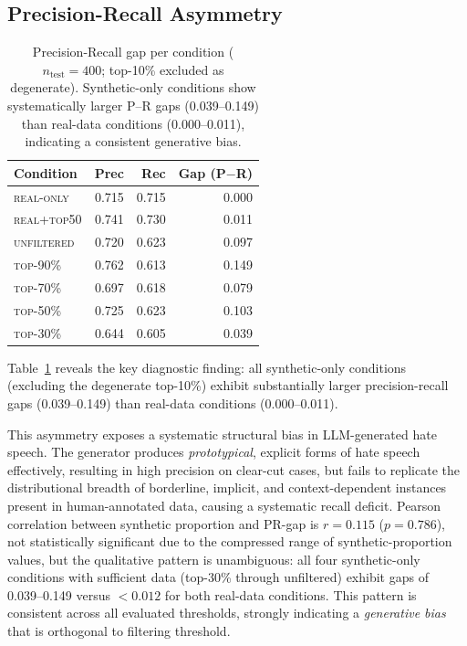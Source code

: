 \documentclass[11pt]{article}
\begin{document}
\subsection{Precision-Recall Asymmetry}

\begin{table}[t]
\centering
\small
\setlength{\tabcolsep}{5pt}
\begin{tabular}{lrrr}
\toprule
\textbf{Condition} & \textbf{Prec} & \textbf{Rec} & \textbf{Gap (P$-$R)} \\
\midrule
\textsc{real-only}   & 0.715 & 0.715 & \phantom{$-$}0.000 \\
\textsc{real+top50} & 0.741 & 0.730 & \phantom{$-$}0.011 \\
\midrule
\textsc{unfiltered}  & 0.720 & 0.623 & \phantom{$-$}0.097 \\
\textsc{top-90\%}    & 0.762 & 0.613 & \phantom{$-$}0.149 \\
\textsc{top-70\%}    & 0.697 & 0.618 & \phantom{$-$}0.079 \\
\textsc{top-50\%}    & 0.725 & 0.623 & \phantom{$-$}0.103 \\
\textsc{top-30\%}    & 0.644 & 0.605 & \phantom{$-$}0.039 \\
\bottomrule
\end{tabular}
\caption{Precision-Recall gap per condition ($n_{\text{test}}=400$; top-10\% excluded as degenerate).
  Synthetic-only conditions show systematically larger P--R gaps (0.039--0.149)
  than real-data conditions (0.000--0.011), indicating a consistent generative bias.}
\label{tab:pr_gap}
\end{table}

Table~\ref{tab:pr_gap} reveals the key diagnostic finding:
all synthetic-only conditions (excluding the degenerate top-10\%)
exhibit substantially larger precision-recall gaps (0.039--0.149)
than real-data conditions (0.000--0.011).

This asymmetry exposes a systematic structural bias in LLM-generated hate speech.
The generator produces \emph{prototypical}, explicit forms of hate speech effectively,
resulting in high precision on clear-cut cases, but fails to replicate the distributional
breadth of borderline, implicit, and context-dependent instances present in human-annotated
data, causing a systematic recall deficit.
Pearson correlation between synthetic proportion and PR-gap is $r = 0.115$ ($p = 0.786$),
not statistically significant due to the compressed range of synthetic-proportion values,
but the qualitative pattern is unambiguous:
all four synthetic-only conditions with sufficient data (top-30\% through unfiltered)
exhibit gaps of 0.039--0.149 versus $< 0.012$ for both real-data conditions.
This pattern is consistent across all evaluated thresholds,
strongly indicating a \emph{generative bias} that is orthogonal to filtering threshold.
\end{document}

